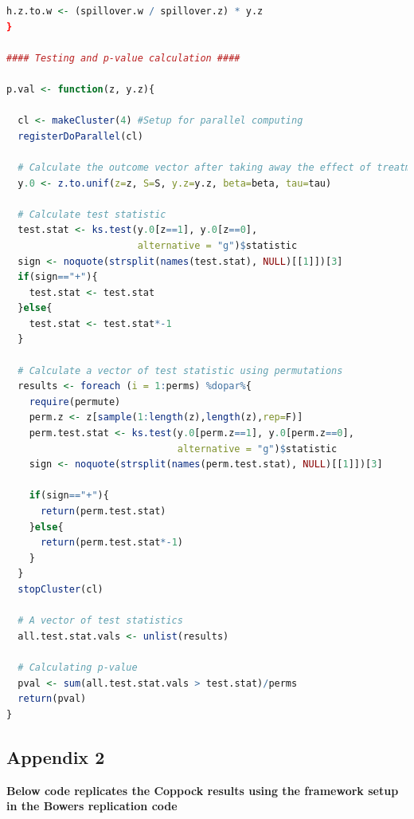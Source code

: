 \documentclass[12pt]{article}
\begin{document}
\begin{lstlisting}[language=R]
  h.z.to.w <- (spillover.w / spillover.z) * y.z
}

#### Testing and p-value calculation ####

p.val <- function(z, y.z){
  
  cl <- makeCluster(4) #Setup for parallel computing
  registerDoParallel(cl)
    
  # Calculate the outcome vector after taking away the effect of treatment
  y.0 <- z.to.unif(z=z, S=S, y.z=y.z, beta=beta, tau=tau)
  
  # Calculate test statistic
  test.stat <- ks.test(y.0[z==1], y.0[z==0],
                       alternative = "g")$statistic
  sign <- noquote(strsplit(names(test.stat), NULL)[[1]])[3]
  if(sign=="+"){
    test.stat <- test.stat
  }else{
    test.stat <- test.stat*-1
  }  
  
  # Calculate a vector of test statistic using permutations
  results <- foreach (i = 1:perms) %dopar%{
    require(permute)
    perm.z <- z[sample(1:length(z),length(z),rep=F)]
    perm.test.stat <- ks.test(y.0[perm.z==1], y.0[perm.z==0],
                              alternative = "g")$statistic
    sign <- noquote(strsplit(names(perm.test.stat), NULL)[[1]])[3]
    
    if(sign=="+"){
      return(perm.test.stat)
    }else{
      return(perm.test.stat*-1)
    }
  }
  stopCluster(cl)
  
  # A vector of test statistics
  all.test.stat.vals <- unlist(results)
  
  # Calculating p-value
  pval <- sum(all.test.stat.vals > test.stat)/perms
  return(pval)
}
\end{lstlisting}


\subsection{Appendix 2}
\textbf{Below code replicates the Coppock results using the framework setup in the Bowers replication code}
\end{document}
